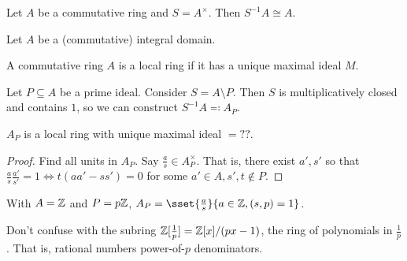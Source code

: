 \begin{examples}
    \item Let $A$ be a commutative ring and $S = A^\times$.
    Then $S^{-1}A \cong A$.
    \item Let $A$ be a (commutative) integral domain.
    \item
    \begin{definition} \label{def:local-ring}
        A commutative ring $A$ is a local ring if it has a unique maximal
        ideal $M$.
    \end{definition}
    Let $P \subseteq A$ be a prime ideal.
    Consider $S = A \setminus P$.
    Then $S$ is multiplicatively closed and contains $1$,
    so we can construct $S^{-1}A \eqcolon A_P$.
    \begin{claim}
        $A_P$ is a local ring with unique maximal ideal $= ??$.
    \end{claim}
    \begin{proof}
        Find all units in $A_P$.
        Say $\frac as \in A_P^\times$.
        That is, there exist $a', s'$ so that $\frac as \frac{a'}{s'} = 1
        \iff t(aa' - ss') = 0$ for some $a' \in A, s', t \notin P$.
    \end{proof}
    \item With $A = \mathbb{Z}$ and $P = p\mathbb{Z}$,
    $A_P = \sset{\frac as}{a \in \Z, (s, p) = 1}$.
    \begin{remark}
        Don't confuse with the subring $\mathbb{Z}[\frac1p] = \mathbb{Z}[x] / (px-1)$,
        the ring of polynomials in $\frac1p$.
        That is, rational numbers power-of-$p$ denominators.
    \end{remark}
\end{examples}

